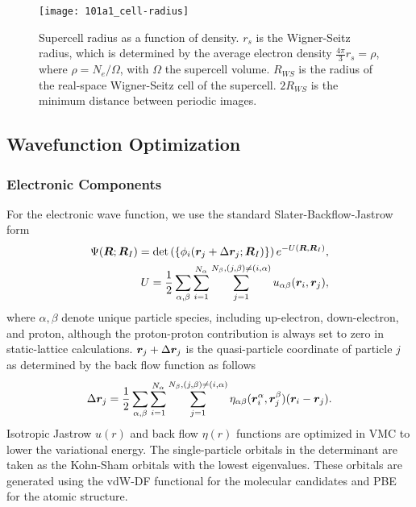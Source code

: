 \begin{figure}[h]
\centering
\texttt{[image: 101a1\_cell-radius]}
\caption{Supercell radius as a function of density. $r_s$ is the Wigner-Seitz radius, which is determined by the average electron density $\frac{4\pi}{3}r_s=\rho$, where $\rho=N_e/\Omega$, with $\Omega$ the supercell volume. $R_{WS}$ is the radius of the real-space Wigner-Seitz cell of the supercell. $2R_{WS}$ is the minimum distance between periodic images. \label{fig:cell-radius}}
\end{figure}

%
%

\subsection{Wavefunction Optimization}

\subsubsection{Electronic Components}
For the electronic wave function, we use the standard Slater-Backflow-Jastrow form
\begin{align}
\Psi(\boldsymbol{R};\boldsymbol{R}_I) = \det\left( \{ \phi_i(\boldsymbol{r}_j+\Delta\boldsymbol{r}_j;\boldsymbol{R}_I)\} \right) e^{-U(\boldsymbol{R},\boldsymbol{R}_I)}, \\
U = \frac{1}{2}\sum\limits_{\alpha, \beta} \sum\limits_{i=1}^{N_\alpha} \sum\limits_{j=1}^{N_\beta, (j,\beta)\neq(i,\alpha)} u_{\alpha\beta}(\boldsymbol{r}_i, \boldsymbol{r}_j), \label{eq:hsolid-ujas}
\end{align}
where $\alpha, \beta$ denote unique particle species, including up-electron, down-electron, and proton, although the proton-proton contribution is always set to zero in static-lattice calculations. $\boldsymbol{r}_j+\Delta\boldsymbol{r}_j$ is the quasi-particle coordinate of particle $j$ as determined by the back flow function as follows
\begin{align}
\Delta \boldsymbol{r}_j = \frac{1}{2}\sum\limits_{\alpha, \beta} \sum\limits_{i=1}^{N_\alpha} \sum\limits_{j=1}^{N_\beta, (j,\beta)\neq(i,\alpha)} \eta_{\alpha\beta}(\boldsymbol{r}_i^\alpha, \boldsymbol{r}_j^\beta)(\boldsymbol{r}_i-\boldsymbol{r}_j).
\label{eq:hsolid-bf}
\end{align}
Isotropic Jastrow $u(r)$ and back flow $\eta(r)$ functions are optimized in VMC to lower the variational energy.
The single-particle orbitals in the determinant are taken as the Kohn-Sham orbitals with the lowest eigenvalues.
These orbitals are generated using the vdW-DF functional for the molecular candidates and PBE for the atomic structure.

